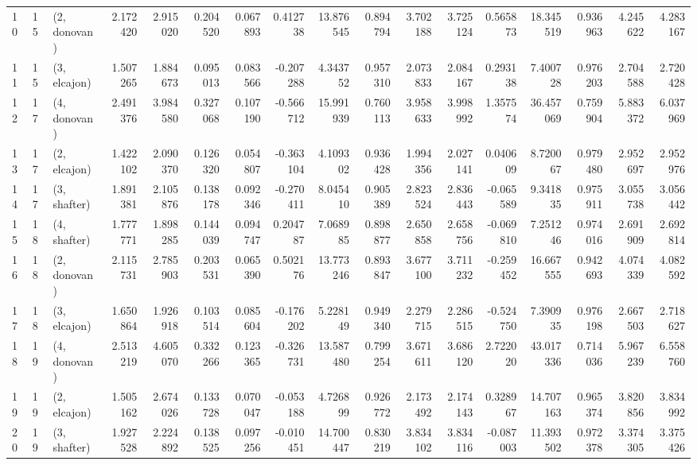\begin{tabular}{lllrrrrrrrrrrrrrr}
10 &    15 &  (2, donovan) &  2.172420 &  2.915020 &   0.204520 &  0.067893 &  0.412738 &  13.876545 &  0.894794 &   3.702188 &  3.725124 &  0.565873 &  18.345519 &  0.936963 &  4.245622 &  4.283167 \\
11 &    15 &  (3, elcajon) &  1.507265 &  1.884673 &   0.095013 &  0.083566 & -0.207288 &   4.343752 &  0.957310 &   2.073833 &  2.084167 &  0.293138 &   7.400728 &  0.976203 &  2.704588 &  2.720428 \\
12 &    17 &  (4, donovan) &  2.491376 &  3.984580 &   0.327068 &  0.107190 & -0.566712 &  15.991939 &  0.760113 &   3.958633 &  3.998992 &  1.357574 &  36.457069 &  0.759904 &  5.883372 &  6.037969 \\
13 &    17 &  (2, elcajon) &  1.422102 &  2.090370 &   0.126320 &  0.054807 & -0.363104 &   4.109302 &  0.936428 &   1.994356 &  2.027141 &  0.040609 &   8.720067 &  0.979480 &  2.952697 &  2.952976 \\
14 &    17 &  (3, shafter) &  1.891381 &  2.105876 &   0.138178 &  0.092346 & -0.270411 &   8.045410 &  0.905389 &   2.823524 &  2.836443 & -0.065589 &   9.341835 &  0.975911 &  3.055738 &  3.056442 \\
15 &    18 &  (4, shafter) &  1.777771 &  1.898285 &   0.144039 &  0.094747 &  0.204787 &   7.068985 &  0.898877 &   2.650858 &  2.658756 & -0.069810 &   7.251246 &  0.974016 &  2.691909 &  2.692814 \\
16 &    18 &  (2, donovan) &  2.115731 &  2.785903 &   0.203531 &  0.065390 &  0.502176 &  13.773246 &  0.893847 &   3.677100 &  3.711232 & -0.259452 &  16.667555 &  0.942693 &  4.074339 &  4.082592 \\
17 &    18 &  (3, elcajon) &  1.650864 &  1.926918 &   0.103514 &  0.085604 & -0.176202 &   5.228149 &  0.949340 &   2.279715 &  2.286515 & -0.524750 &   7.390935 &  0.976198 &  2.667503 &  2.718627 \\
18 &    19 &  (4, donovan) &  2.513219 &  4.605070 &   0.332266 &  0.123365 & -0.326731 &  13.587480 &  0.799254 &   3.671611 &  3.686120 &  2.722020 &  43.017336 &  0.714036 &  5.967239 &  6.558760 \\
19 &    19 &  (2, elcajon) &  1.505162 &  2.674026 &   0.133728 &  0.070047 & -0.053188 &   4.726899 &  0.926772 &   2.173492 &  2.174143 &  0.328967 &  14.707163 &  0.965374 &  3.820856 &  3.834992 \\
20 &    19 &  (3, shafter) &  1.927528 &  2.224892 &   0.138525 &  0.097256 & -0.010451 &  14.700447 &  0.830219 &   3.834102 &  3.834116 & -0.087003 &  11.393502 &  0.972378 &  3.374305 &  3.375426 \\

\end{tabular}
